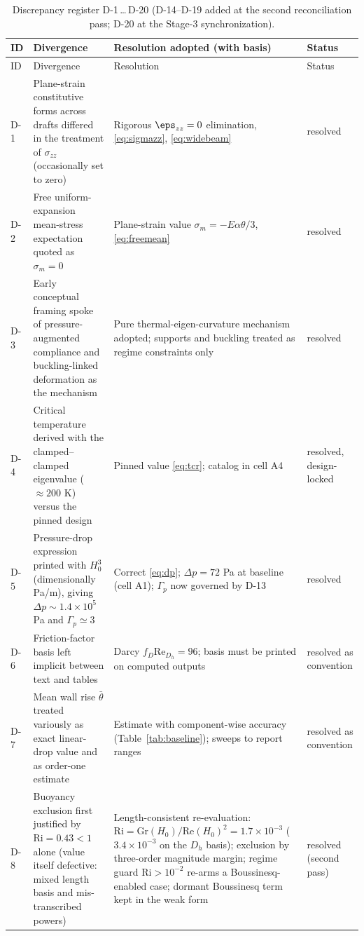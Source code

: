 \begin{longtable}{p{1cm}p{4.6cm}p{5.2cm}p{3.2cm}}
\caption{Discrepancy register D-1\,\ldots\,D-20 (D-14--D-19 added at the second reconciliation pass; D-20 at the Stage-3 synchronization).}\label{tab:register}\\
\toprule
ID & Divergence & Resolution adopted (with basis) & Status \\
\midrule
\endfirsthead
\toprule
ID & Divergence & Resolution & Status \\
\midrule
\endhead
D-1 & Plane-strain constitutive forms across drafts differed in the treatment of $\sigma_{zz}$ (occasionally set to zero) & Rigorous $\eps_{zz}=0$ elimination, \eqref{eq:sigmazz}, \eqref{eq:widebeam} & resolved \\
D-2 & Free uniform-expansion mean-stress expectation quoted as $\sigma_m=0$ & Plane-strain value $\sigma_m=-E\alpha\theta/3$, \eqref{eq:freemean} & resolved \\
D-3 & Early conceptual framing spoke of pressure-augmented compliance and buckling-linked deformation as the mechanism & Pure thermal-eigen-curvature mechanism adopted; supports and buckling treated as regime constraints only & resolved \\
D-4 & Critical temperature derived with the clamped--clamped eigenvalue ($\approx200$ K) versus the pinned design & Pinned value \eqref{eq:tcr}; catalog in cell A4 & resolved, design-locked \\
D-5 & Pressure-drop expression printed with $H_0^3$ (dimensionally Pa/m), giving $\Delta p\sim1.4\times10^5$ Pa and $\Gamma_p\simeq3$ & Correct \eqref{eq:dp}; $\Delta p=72$ Pa at baseline (cell A1); $\Gamma_p$ now governed by D-13 & resolved \\
D-6 & Friction-factor basis left implicit between text and tables & Darcy $f_D\mathrm{Re}_{D_h}=96$; basis must be printed on computed outputs & resolved as convention \\
D-7 & Mean wall rise $\bar\theta$ treated variously as exact linear-drop value and as order-one estimate & Estimate with component-wise accuracy (Table~\ref{tab:baseline}); sweeps to report ranges & resolved as convention \\
D-8 & Buoyancy exclusion first justified by $\mathrm{Ri}=0.43<1$ alone (value itself defective: mixed length basis and mis-transcribed powers) & Length-consistent re-evaluation: $\mathrm{Ri}=\mathrm{Gr}(H_0)/\mathrm{Re}(H_0)^2=1.7\times10^{-3}$ ($3.4\times10^{-3}$ on the $D_h$ basis); exclusion by three-order magnitude margin; regime guard $\mathrm{Ri}>10^{-2}$ re-arms a Boussinesq-enabled case; dormant Boussinesq term kept in the weak form & resolved (second pass) \\

\end{longtable}
